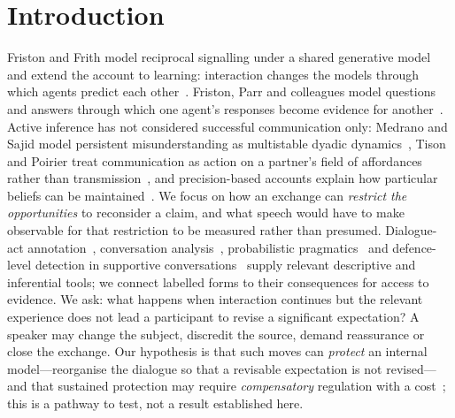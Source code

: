 \documentclass[runningheads]{llncs}
\begin{document}
\section{Introduction}
Friston and Frith model reciprocal signalling under a shared generative model~\cite{friston2015duet} and extend the account to learning: interaction changes the models through which agents predict each other~\cite{friston2015hermeneutics}. Friston, Parr and colleagues model questions and answers through which one agent's responses become evidence for another~\cite{friston2020linguistic}. Active inference has not considered successful communication only: Medrano and Sajid model persistent misunderstanding as multistable dyadic dynamics~\cite{medrano2024broken}, Tison and Poirier treat communication as action on a partner's field of affordances rather than transmission~\cite{tison2021communication}, and precision-based accounts explain how particular beliefs can be maintained~\cite{prosser2018psychopathy}. We focus on how an exchange can \emph{restrict the opportunities} to reconsider a claim, and what speech would have to make observable for that restriction to be measured rather than presumed. Dialogue-act annotation~\cite{bunt2020iso}, conversation analysis~\cite{schegloff2007sequence}, probabilistic pragmatics~\cite{goodman2016pragmatic,yoon2020polite} and defence-level detection in supportive conversations~\cite{na2026defenses} supply relevant descriptive and inferential tools; we connect labelled forms to their consequences for access to evidence. We ask: what happens when interaction continues but the relevant experience does not lead a participant to revise a significant expectation? A speaker may change the subject, discredit the source, demand reassurance or close the exchange. Our hypothesis is that such moves can \emph{protect} an internal model---reorganise the dialogue so that a revisable expectation is not revised---and that sustained protection may require \emph{compensatory} regulation with a cost~\cite{svet2026paperI,svet2026paperII}; this is a pathway to test, not a result established here.
\end{document}
